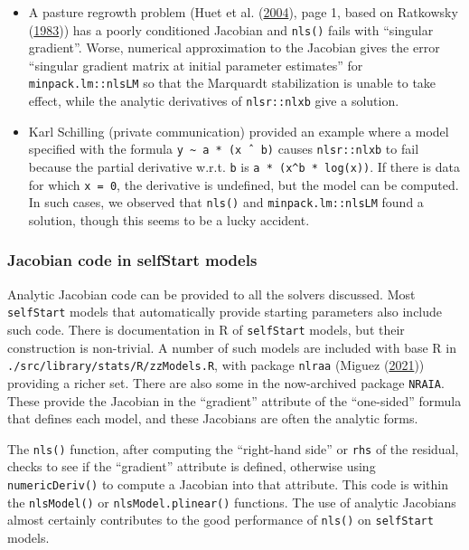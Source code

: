 \documentclass[
]{article}
\begin{document}
\begin{itemize}
\item
  A pasture regrowth problem (Huet et al.
  (\protect\hyperlink{ref-Huet2004}{2004}), page 1, based on Ratkowsky
  (\protect\hyperlink{ref-Ratkowsky1983}{1983})) has a poorly
  conditioned Jacobian and \texttt{nls()} fails with ``singular
  gradient''. Worse, numerical approximation to the Jacobian gives the
  error ``singular gradient matrix at initial parameter estimates'' for
  \texttt{minpack.lm::nlsLM} so that the Marquardt stabilization is
  unable to take effect, while the analytic derivatives of
  \texttt{nlsr::nlxb} give a solution.
\item
  Karl Schilling (private communication) provided an example where a
  model specified with the formula
  \texttt{y\ \textasciitilde{}\ a\ *\ (x\ ˆ\ b)} causes
  \texttt{nlsr::nlxb} to fail because the partial derivative w.r.t.
  \texttt{b} is \texttt{a\ *\ (x\^{}b\ *\ log(x))}. If there is data for
  which \texttt{x\ =\ 0}, the derivative is undefined, but the model can
  be computed. In such cases, we observed that \texttt{nls()} and
  \texttt{minpack.lm::nlsLM} found a solution, though this seems to be a
  lucky accident.
\end{itemize}

\hypertarget{jacobian-code-in-selfstart-models}{%
\subsubsection{Jacobian code in selfStart
models}\label{jacobian-code-in-selfstart-models}}

Analytic Jacobian code can be provided to all the solvers discussed.
Most \texttt{selfStart} models that automatically provide starting
parameters also include such code. There is documentation in R of
\texttt{selfStart} models, but their construction is non-trivial. A
number of such models are included with base R in
\texttt{./src/library/stats/R/zzModels.R}, with package \texttt{nlraa}
(Miguez (\protect\hyperlink{ref-MiguezNLRAA2021}{2021})) providing a
richer set. There are also some in the now-archived package
\texttt{NRAIA}. These provide the Jacobian in the ``gradient'' attribute
of the ``one-sided'' formula that defines each model, and these
Jacobians are often the analytic forms.

The \texttt{nls()} function, after computing the ``right-hand side'' or
\texttt{rhs} of the residual, checks to see if the ``gradient''
attribute is defined, otherwise using \texttt{numericDeriv()} to compute
a Jacobian into that attribute. This code is within the
\texttt{nlsModel()} or \texttt{nlsModel.plinear()} functions. The use of
analytic Jacobians almost certainly contributes to the good performance
of \texttt{nls()} on \texttt{selfStart} models.
\end{document}
